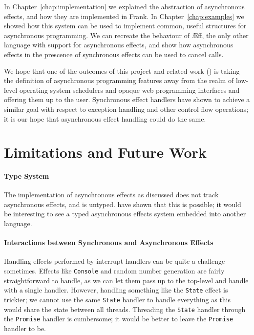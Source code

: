 \documentclass[msc,deptreport,cs]{infthesis} %
\newcommand{\code}[1]{\lstinline{#1}}
\newcommand\aeff{{\AE}ff\xspace}
\newcommand{\todo}[1]
           {{\par\noindent\small\color{RoyalPurple}
  \framebox{\parbox{\dimexpr\linewidth-2\fboxsep-2\fboxrule}
    {\textbf{TODO:} #1}}}}
\begin{document}
In Chapter~\ref{chap:implementation} we explained the abstraction of
asynchronous effects, and how they are implemented in Frank. In
Chapter~\ref{chap:examples} we showed how this system can be used to implement
common, useful structures for asynchronous programming. We can recreate the
behaviour of \aeff, the only other language with support for asynchronous
effects, and show how asynchronous effects in the prescence of synchronous
effects can be used to cancel calls.

We hope that one of the outcomes of this project and related work
(\cite{ahman2020asynchronous, leijen2017structured, dolan2017concurrent}) is
taking the definition of asynchronous programming features away from the realm
of low-level operating system schedulers and opaque web programming interfaces
and offering them up to the user. Synchronous effect handlers have shown to
achieve a similar goal with respect to exception handling and other control flow
operations; it is our hope that asynchronous effect handling could do the same.





\section{Limitations and Future Work}

\paragraph*{Type System}
The implementation of asynchronous effects as discussed does not track
asynchronous effects, and is untyped. \citeauthor{ahman2020asynchronous} have
shown that this is possible; it would be interesting to see a typed asynchronous effects system embedded into another language.

\paragraph*{Interactions between Synchronous and Asynchronous Effects}
Handling effects performed by interrupt handlers can be quite a challenge
sometimes. Effects like \code{Console} and random number generation are fairly
straightforward to handle, as we can let them pass up to the top-level and
handle with a single handler. However, handling something like the \code{State}
effect is trickier; we cannot use the same \code{State} handler to handle
everything as this would share the state between all threads. Threading the
\code{State} handler through the \code{Promise} handler is cumbersome; it would
be better to leave the \code{Promise} handler to be.
\end{document}

